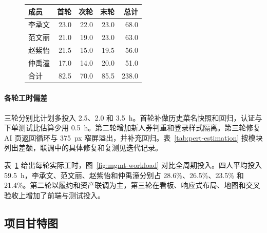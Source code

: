 \begin{figure}[!htbp]
  \centering
  \begin{minipage}[t]{.46\linewidth}
    \centering\vspace{0pt}
    \resizebox{.98\linewidth}{!}{}
    \label{fig:mgmt-workload}
  \end{minipage}\hfill
  \begin{minipage}[t]{.51\linewidth}
    \centering\vspace{0pt}
    \label{tab:member-workload}
    \reporttablesize
    \setlength{\tabcolsep}{3pt}
    \begin{tabular}{@{}lrrrr@{}}
      \toprule
      \textbf{成员} & \textbf{首轮} & \textbf{次轮} & \textbf{末轮} & \textbf{总计} \\
      \midrule
      李承文 & 23.0 & 22.0 & 23.0 & 68.0 \\
      范文丽 & 21.0 & 19.0 & 23.0 & 63.0 \\
      赵紫怡 & 21.5 & 15.0 & 19.5 & 56.0 \\
      仲禹潼 & 17.0 & 14.0 & 20.0 & 51.0 \\
      \midrule
      合计 & 82.5 & 70.0 & 85.5 & 238.0 \\
      \bottomrule
    \end{tabular}
  \end{minipage}
\end{figure}

\paragraph{各轮工时偏差}
三轮分别比计划多投入 2.5、2.0 和 3.5~h。首轮补做历史菜名快照和回归，认证与下单测试比估算少用 0.5~h。第二轮增加新人券判重和登录样式隔离。第三轮修复 AI 页返回循环与 375~px 窄屏溢出，并补充回归。表~\ref{tab:pert-estimation} 按模块列出差额，联调中的具体修复和复测见迭代记录。

表~\ref{tab:member-workload} 给出每轮实际工时，图~\ref{fig:mgmt-workload} 对比全周期投入。四人平均投入 59.5~h，李承文、范文丽、赵紫怡和仲禹潼分别占 28.6\%、26.5\%、23.5\% 和 21.4\%。第二轮以履约和资产联调为主，第三轮在看板、响应式布局、地图和交叉验收上增加了前端与测试投入。

\subsection{项目甘特图}

